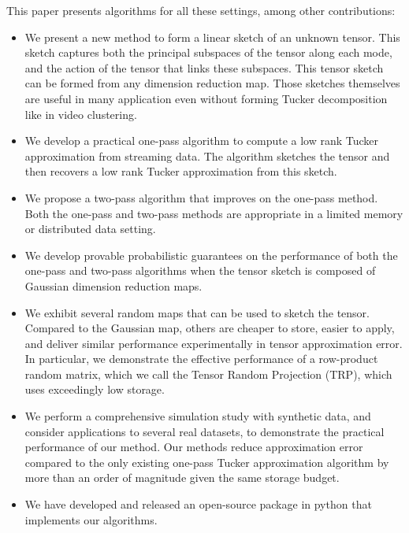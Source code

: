 This paper presents algorithms for all these settings,
among other contributions:
\begin{itemize}
	\item We present a new method to form a linear sketch of an unknown tensor.  This sketch captures both the principal subspaces of the tensor along each mode, and the action of the tensor that links these subspaces.
	This tensor sketch can be formed from any	dimension reduction map. Those sketches themselves  are useful in many application even without forming Tucker decomposition like in video clustering. 

	\item We develop a practical one-pass algorithm
	to compute a low rank Tucker approximation from streaming data.
	The algorithm sketches the tensor and then recovers a low rank Tucker approximation from this sketch.

	\item We propose a two-pass algorithm that improves on the  one-pass method.
	Both the one-pass and two-pass methods are appropriate in a limited memory or distributed data setting.

	\item We develop provable probabilistic guarantees on the performance of both the
	one-pass and two-pass algorithms
	when the tensor sketch is composed of Gaussian dimension reduction maps.

	\item We exhibit several random maps that can be used to sketch the tensor.
	Compared to the Gaussian map,
	others are cheaper to store, easier to apply, and deliver similar performance
	experimentally in tensor approximation error.
	In particular, we demonstrate the effective performance of a
	row-product random matrix, which we call the Tensor Random Projection (TRP),
	which uses exceedingly low storage.

	\item We perform a comprehensive simulation study with synthetic data,
	and consider applications to several real datasets,
	to demonstrate the practical performance of our method.
	Our methods reduce approximation error compared to
	the only existing one-pass Tucker approximation algorithm \cite{malik2018low}
	by more than an order of magnitude given the same storage budget.

	\item We have developed and released an open-source package in python that implements our algorithms.
\end{itemize}

